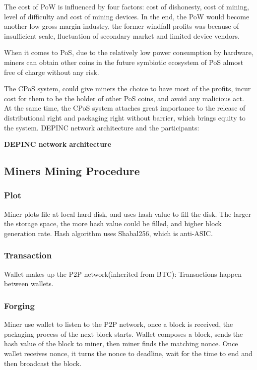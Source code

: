 \begin{flushleft}
    The cost of PoW is influenced by four factors: cost of dishonesty, cost of mining, level of difficulty and cost of mining devices. In the end, the PoW would become another low gross margin industry, the former windfall profits was because of insufficient scale, fluctuation of secondary market and limited device vendors.
\end{flushleft}
\begin{flushleft}
    When it comes to PoS, due to the relatively low power consumption by hardware, miners can obtain other coins in the future symbiotic ecosystem of PoS almost free of charge without any risk.
\end{flushleft}
\begin{flushleft}
    The CPoS system, could give miners the choice to have most of the profits, incur cost for them to be the holder of other PoS coins, and avoid any malicious act. At the same time, the CPoS system attaches great importance to the release of distributional right and packaging right without barrier, which brings equity to the system. DEPINC network architecture and the participants:
\end{flushleft}
\begin{flushleft}
    \centering\textbf{DEPINC network architecture}
\end{flushleft}

\subsection{Miners Mining Procedure}
\subsubsection{Plot}
\begin{flushleft}
    Miner plots file at local hard disk, and uses hash value to fill the disk. The larger the storage space, the more hash value could be filled, and higher block generation rate. Hash algorithm uses Shabal256, which is anti-ASIC.
\end{flushleft}
\subsubsection{Transaction}
\begin{flushleft}
    Wallet makes up the P2P network(inherited from BTC): Transactions happen between wallets.
\end{flushleft}
\subsubsection{Forging}
\begin{flushleft}
    Miner use wallet to listen to the P2P network, once a block is received, the packaging process of the next block starts. Wallet composes a block, sends the hash value of the block to miner, then miner finds the matching nonce. Once wallet receives nonce, it turns the nonce to deadline, wait for the time to end and then broadcast the block.
\end{flushleft}
